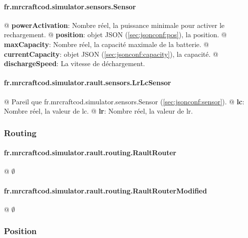 \documentclass[final]{polytech/polytech}
\begin{document}
				\paragraph{fr.mrcraftcod.simulator.sensors.Sensor\label{sec:jsonconf:sensor}}
					\begin{easylist}[itemize]
						@ \textbf{powerActivation}: Nombre réel, la puissance minimale pour activer le rechargement.
						@ \textbf{position}: objet JSON (\autoref{sec:jsonconf:pos}), la position.
						@ \textbf{maxCapacity}: Nombre réel, la capacité maximale de la batterie.
						@ \textbf{currentCapacity}: objet JSON (\autoref{sec:jsonconf:capacity}), la capacité.
						@ \textbf{dischargeSpeed}: La vitesse de déchargement.
					\end{easylist}
					
				\paragraph{fr.mrcraftcod.simulator.rault.sensors.LrLcSensor}
					\begin{easylist}[itemize]
						@ Pareil que fr.mrcraftcod.simulator.sensors.Sensor (\autoref{sec:jsonconf:sensor}).
						@ \textbf{lc}: Nombre réel, la valeur de lc.
						@ \textbf{lr}: Nombre réel, la valeur de lr.
					\end{easylist}
					
			\subsubsection{Routing}
				\paragraph{fr.mrcraftcod.simulator.rault.routing.RaultRouter}
					\begin{easylist}[itemize]
						@ $\emptyset$
					\end{easylist}
					
				\paragraph{fr.mrcraftcod.simulator.rault.routing.RaultRouterModified}
					\begin{easylist}[itemize]
						@ $\emptyset$
					\end{easylist}
					
			\subsubsection{Position\label{sec:jsonconf:pos}}
\end{document}

